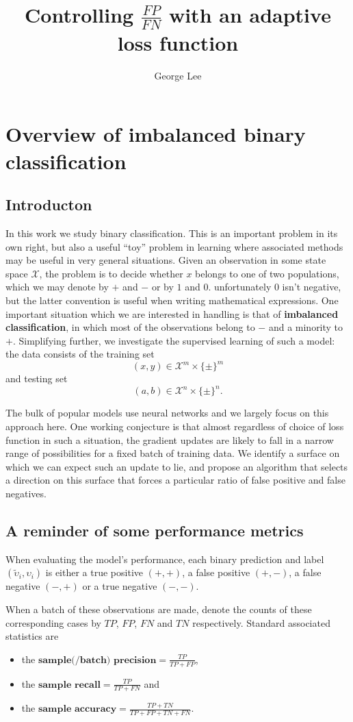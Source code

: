 \documentclass[10pt,a4paper]{article}
\title{Controlling $\tfrac{FP}{FN}$ with an adaptive loss function}
\author{George Lee}
\begin{document}
\maketitle
\section{Overview of imbalanced binary classification}
\subsection{Introducton}
In this work we study binary classification.
This is an important problem in its own right, but also a useful ``toy'' problem in learning where associated methods may be useful in very general situations.
Given an observation in some state space $\mathcal X$, the problem is to decide whether $x$ belongs to one of two populations, which we may denote by $+$ and $-$ or by $1$ and $0$.
unfortunately 0 isn't negative, but the latter convention is useful when writing mathematical expressions.
One important situation which we are interested in handling is that of \textbf{imbalanced classification}, in which most of the observations belong to $-$ and a minority to $+$.
Simplifying further, we investigate the supervised learning of such a model: the data consists of the training set
$$
(x,y)\in\mathcal X^m\times\{\pm\}^m
$$
and testing set
$$
(a,b)\in\mathcal X^n\times\{\pm\}^n.
$$

The bulk of popular models use neural networks and we largely focus on this approach here.
One working conjecture is that almost regardless of choice of loss function in such a situation, the gradient updates are likely to fall in a narrow range of possibilities for a fixed batch of training data.
We identify a surface on which we can expect such an update to lie, and propose an algorithm that selects a direction on this surface that forces a particular ratio of false positive and false negatives.
\subsection{A reminder of some performance metrics}
When evaluating the model's performance, each binary prediction and label $(\widetilde\upsilon_i,\upsilon_i)$ is either a true positive $(+,+)$, a false positive $(+,-)$, a false negative $(-,+)$ or a true negative $(-,-)$.

When a batch of these observations are made, denote the counts of these corresponding cases by $TP$, $FP$, $FN$ and $TN$ respectively.
Standard associated statistics are
\begin{itemize}
  \item the $\textbf{sample(/batch) precision}=\frac{TP}{TP+FP}$,
  \item the $\textbf{sample recall}=\frac{TP}{TP+FN}$ and
  \item the $\textbf{sample accuracy}=\frac{TP+TN}{TP+FP+TN+FN}$.
\end{itemize}
\end{document}
